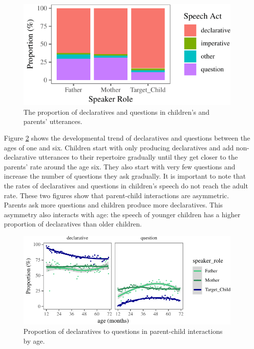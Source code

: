 \documentclass[oneside]{report}
\theoremstyle{definition}
\theoremstyle{definition}
\theoremstyle{definition}
\theoremstyle{remark}
\begin{document}
\begin{figure}[tb]

{\centering \includegraphics{figs/totalUtteranceTypePlot-1} 

}

\caption{The proportion of declaratives and questions in children's and parents' utterances.}\label{fig:totalUtteranceTypePlot}
\end{figure}
Figure \ref{fig:utteranceTypeByAgePlot} shows the developmental trend of
declaratives and questions between the ages of one and six. Children
start with only producing declaratives and add non-declarative
utterances to their repertoire gradually until they get closer to the
parents' rate around the age six. They also start with very few
questions and increase the number of questions they ask gradually. It is
important to note that the rates of declaratives and questions in
children's speech do not reach the adult rate. These two figures show
that parent-child interactions are asymmetric. Parents ask more
questions and children produce more declaratives. This asymmetry also
interacts with age: the speech of younger children has a higher
proportion of declaratives than older children.
\begin{figure}
\centering
\includegraphics{figs/utteranceTypeByAgePlot-1.pdf}
\caption{\label{fig:utteranceTypeByAgePlot}Proportion of declaratives to
questions in parent-child interactions by age.}
\end{figure}
\end{document}
